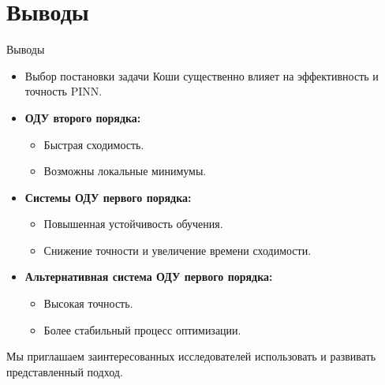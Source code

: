 \documentclass{beamer}
\begin{document}
\section{Выводы}
\begin{frame}{Выводы}
    \begin{itemize}
        \item Выбор постановки задачи Коши существенно влияет на эффективность и точность PINN.
        \item \textbf{ОДУ второго порядка:}
        \begin{itemize}
            \item Быстрая сходимость.
            \item Возможны локальные минимумы.
        \end{itemize}
        \item \textbf{Системы ОДУ первого порядка:}
        \begin{itemize}
            \item Повышенная устойчивость обучения.
            \item Снижение точности и увеличение времени сходимости.
        \end{itemize}
        \item \textbf{Альтернативная система ОДУ первого порядка:}
        \begin{itemize}
            \item Высокая точность.
            \item Более стабильный процесс оптимизации.
        \end{itemize}
    \end{itemize}
    Мы приглашаем заинтересованных исследователей использовать и развивать представленный подход.~
\end{frame}

\printbibliography
\end{document}

